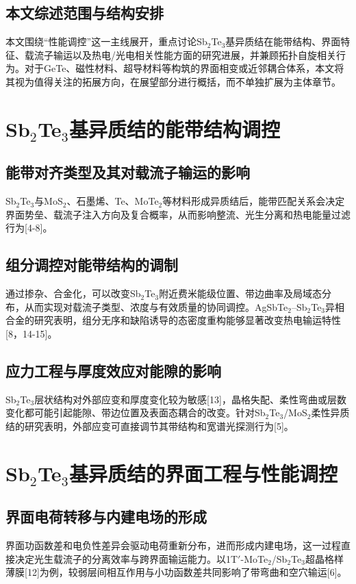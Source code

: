 \documentclass[12pt,a4paper]{ctexart}
\begin{document}
\subsection{本文综述范围与结构安排}
本文围绕“性能调控”这一主线展开，重点讨论Sb$_2$Te$_3$基异质结在能带结构、界面特征、载流子输运以及热电/光电相关性能方面的研究进展，并兼顾拓扑自旋相关行为。对于GeTe、磁性材料、超导材料等构筑的界面相变或近邻耦合体系，本文将其视为值得关注的拓展方向，在展望部分进行概括，而不单独扩展为主体章节。

\section{\texorpdfstring{Sb$_2$Te$_3$}{Sb2Te3}基异质结的能带结构调控}

\subsection{能带对齐类型及其对载流子输运的影响}
Sb$_2$Te$_3$与MoS$_2$、石墨烯、Te、MoTe$_2$等材料形成异质结后，能带匹配关系会决定界面势垒、载流子注入方向及复合概率，从而影响整流、光生分离和热电能量过滤行为[4-8]。

\subsection{组分调控对能带结构的调制}
通过掺杂、合金化，可以改变Sb$_2$Te$_3$附近费米能级位置、带边曲率及局域态分布，从而实现对载流子类型、浓度与有效质量的协同调控。AgSbTe$_2$--Sb$_2$Te$_3$异相合金的研究表明，组分无序和缺陷诱导的态密度重构能够显著改变热电输运特性[8，14-15]。

\subsection{应力工程与厚度效应对能隙的影响}
Sb$_2$Te$_3$层状结构对外部应变和厚度变化较为敏感[13]，晶格失配、柔性弯曲或层数变化都可能引起能隙、带边位置及表面态耦合的改变。针对Sb$_2$Te$_3$/MoS$_2$柔性异质结的研究表明，外部应变可直接调节其带结构和宽谱光探测行为[5]。

\section{\texorpdfstring{Sb$_2$Te$_3$}{Sb2Te3}基异质结的界面工程与性能调控}

\subsection{界面电荷转移与内建电场的形成}
界面功函数差和电负性差异会驱动电荷重新分布，进而形成内建电场，这一过程直接决定光生载流子的分离效率与跨界面输运能力。以1T$'$-MoTe$_2$/Sb$_2$Te$_3$超晶格样薄膜[12]为例，较弱层间相互作用与小功函数差共同影响了带弯曲和空穴输运[6]。
\end{document}
